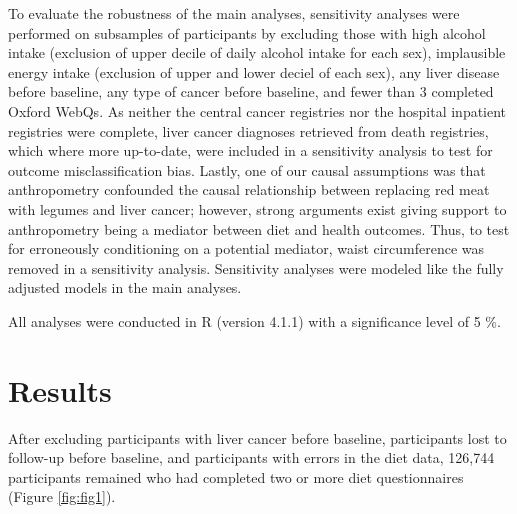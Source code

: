 \documentclass[sn-basic,Numbered,pdflatex]{sn-jnl}
\begin{document}
To evaluate the robustness of the main analyses, sensitivity analyses
were performed on subsamples of participants by excluding those with
high alcohol intake (exclusion of upper decile of daily alcohol intake
for each sex), implausible energy intake (exclusion of upper and lower
deciel of each sex), any liver disease before baseline, any type of
cancer before baseline, and fewer than 3 completed Oxford WebQs. As
neither the central cancer registries nor the hospital inpatient
registries were complete, liver cancer diagnoses retrieved from death
registries, which where more up-to-date, were included in a sensitivity
analysis to test for outcome misclassification bias. Lastly, one of our
causal assumptions was that anthropometry confounded the causal
relationship between replacing red meat with legumes and liver cancer;
however, strong arguments exist giving support to anthropometry being a
mediator between diet and health outcomes. Thus, to test for erroneously
conditioning on a potential mediator, waist circumference was removed in
a sensitivity analysis. Sensitivity analyses were modeled like the fully
adjusted models in the main analyses.

All analyses were conducted in R (version 4.1.1) with a significance
level of 5 \%.

\hypertarget{sec3}{%
\section{Results}\label{sec3}}

After excluding participants with liver cancer before baseline,
participants lost to follow-up before baseline, and participants with
errors in the diet data, 126,744 participants remained who had completed
two or more diet questionnaires (Figure \ref{fig:fig1}).
\end{document}

